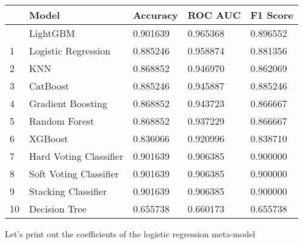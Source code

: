 \documentclass[
  letterpaper,
  DIV=11,
  numbers=noendperiod]{scrreprt}
\begin{document}
\begin{longtable}[]{@{}lllll@{}}
\toprule\noalign{}
& Model & Accuracy & ROC AUC & F1 Score \\
\midrule\noalign{}
\endhead
\bottomrule\noalign{}
\endlastfoot
0 & LightGBM & 0.901639 & 0.965368 & 0.896552 \\
1 & Logistic Regression & 0.885246 & 0.958874 & 0.881356 \\
2 & KNN & 0.868852 & 0.946970 & 0.862069 \\
3 & CatBoost & 0.885246 & 0.945887 & 0.885246 \\
4 & Gradient Boosting & 0.868852 & 0.943723 & 0.866667 \\
5 & Random Forest & 0.868852 & 0.937229 & 0.866667 \\
6 & XGBoost & 0.836066 & 0.920996 & 0.838710 \\
7 & Hard Voting Classifier & 0.901639 & 0.906385 & 0.900000 \\
8 & Soft Voting Classifier & 0.901639 & 0.906385 & 0.900000 \\
9 & Stacking Classifier & 0.901639 & 0.906385 & 0.900000 \\
10 & Decision Tree & 0.655738 & 0.660173 & 0.655738 \\
\end{longtable}

Let's print out the coefficients of the logistic regression meta-model
\end{document}

